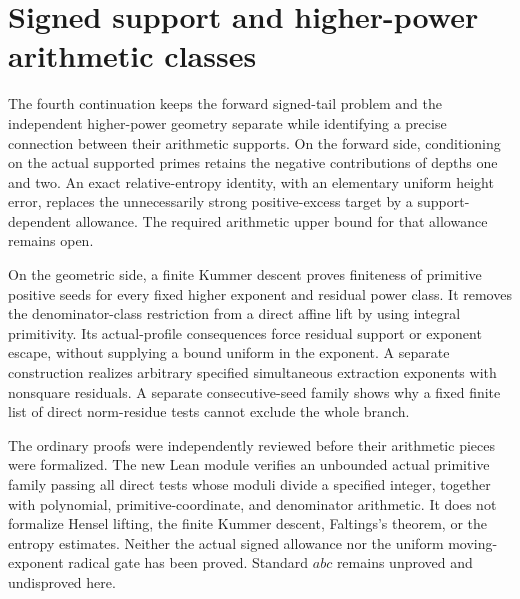 \section{Signed support and higher-power arithmetic classes}
\label{sec:support-power-checkpoint}

The fourth continuation keeps the forward signed-tail problem and the
independent higher-power geometry separate while identifying a precise
connection between their arithmetic supports. On the forward side,
conditioning on the actual supported primes retains the negative
contributions of depths one and two. An exact relative-entropy identity,
with an elementary uniform height error, replaces the unnecessarily strong
positive-excess target by a support-dependent allowance. The required
arithmetic upper bound for that allowance remains open.

On the geometric side, a finite Kummer descent proves finiteness of
primitive positive seeds for every fixed higher exponent and residual
power class. It removes the denominator-class restriction from a direct
affine lift by using integral primitivity. Its actual-profile consequences
force residual support or exponent escape, without supplying a bound
uniform in the exponent. A separate construction realizes arbitrary
specified simultaneous extraction exponents with nonsquare residuals.
A separate consecutive-seed family shows why a fixed finite list of
direct norm-residue tests cannot exclude the whole branch.

The ordinary proofs were independently reviewed before their arithmetic
pieces were formalized. The new Lean module verifies an unbounded actual
primitive family passing all direct tests whose moduli divide a specified
integer, together with polynomial, primitive-coordinate, and denominator
arithmetic. It does not formalize Hensel lifting, the finite Kummer
descent, Faltings's theorem, or the entropy estimates. Neither the actual
signed allowance nor the uniform moving-exponent radical gate has been
proved. Standard $abc$ remains unproved and undisproved here.
